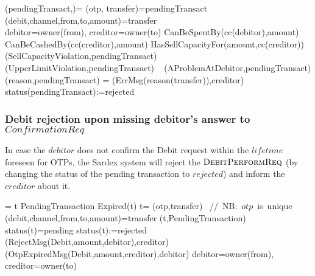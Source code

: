 \begin{asm}
(pendingTransact,)=\+
\LET (otp, transfer)=pendingTransact\\
 \LET (debit,channel,from,to,amount)=transfer\\
\LET debitor=owner(from), creditor=owner(to)\+
              \IF CanBeSpentBy(cc(debitor),amount) \THEN \+
                 \IF CanBeCashedBy(cc(creditor),amount) \THEN \+
                    \IF HasSellCapacityFor(amount,cc(creditor)) \THEN \+
                        \-
                       \ELSE ~ 
                       (SellCapacityViolation,pendingTransact) \-
                 \ELSE ~ 
              (UpperLimitViolation,pendingTransact) \-
              \ELSE ~  
              (AProblemAtDebitor,pendingTransact) \dec\-
              \WHERE \+
              (reason,pendingTransact)  =\+
              (ErrMsg(reason(transfer)),\TO creditor)\\
              status(pendingTransact):=rejected 
\end{asm}


\subsubsection{Debit rejection upon missing debitor's answer to $ConfirmationReq$\\}
\label{sect:debitreject}
In case the $debitor$ does not confirm the Debit request within the $lifetime$ foreseen for OTPs, the Sardex system will reject the $\hbox{\sc DebitPerformReq}$ (by changing the status of the pending transaction to $rejected$) and inform the $creditor$ about it.
\begin{asm} 
 =\+          
\IF t \in PendingTransaction \AND Expired(t)  \THEN  \+
          \LET t= (otp,transfer) \mbox{ // NB: $otp$ is unique}\\
          \LET (debit,channel,from,to,amount)=transfer \+
(t,PendingTransaction) \\
          \IF status(t)=pending \THEN \+
          status(t):=rejected\\
(RejectMsg(Debit,amount,debitor),\TO creditor)\\ 
(OtpExpiredMsg(Debit,amount,creditor),\TO debitor)  \dec\dec\dec \-
          \WHERE debitor=owner(from), creditor=owner(to)
\end{asm}

